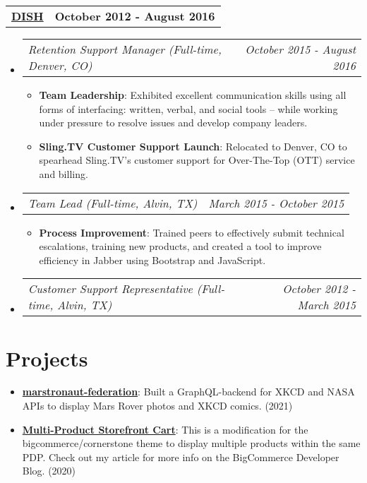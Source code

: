 \documentclass[letterpaper,10.8pt]{article}
\makeatletter
\newcommand{\resumeItem}[2]{
  \item\small{
    \textbf{#1}{: #2 \vspace{-2pt}}
  }
}
\newcommand{\jobLineItem}[2]{
  \vspace{0pt}\item[]
    \begin{tabular*}{0.98\textwidth}{l@{\extracolsep{\fill}}r}
      \textit{#1} & \textit{\small #2} \\
    \end{tabular*}\vspace{-4pt}
}
\newcommand{\employerTitle}[3]{
  \begin{tabular*}{1\textwidth}{l@{\extracolsep{\fill}}r}
    \href{#1}{\textbf{#2}} & \textbf{#3} \\
  \end{tabular*}\vspace{-4pt}
}
\newcommand{\resumeSubItem}[2]{\resumeItem{#1}{#2}\vspace{-5pt}}
\newcommand{\resumeSubHeadingListStart}{\begin{itemize}[leftmargin=*]}
\newcommand{\resumeSubHeadingListEnd}{\end{itemize}}
\newcommand{\resumeItemListStart}{\begin{itemize}}
\newcommand{\resumeItemListEnd}{\end{itemize}\vspace{-5pt}}
\makeatother
\begin{document}
  \employerTitle
    {https://dish.com}{DISH}{October 2012 - August 2016}
  \resumeSubHeadingListStart
    \jobLineItem
        {Retention Support Manager (Full-time, Denver, CO)}{October 2015 - August 2016}
    \resumeItemListStart
        \resumeItem{Team Leadership}{Exhibited excellent communication skills using all forms of interfacing: written, verbal, and social tools – while working under pressure to resolve issues and develop company leaders.} 
        \resumeItem{Sling.TV Customer Support Launch}
        {Relocated to Denver, CO to spearhead Sling.TV's customer support for Over-The-Top (OTT) service and billing.}
    \resumeItemListEnd
    \jobLineItem
        {Team Lead (Full-time, Alvin, TX)}{March 2015 - October 2015}
    \resumeItemListStart
        \resumeItem{Process Improvement}
        {Trained peers to effectively submit technical escalations, training new products, and created a tool to improve efficiency in Jabber using Bootstrap and JavaScript.}
      \resumeItemListEnd
    \jobLineItem
		    {Customer Support Representative (Full-time, Alvin, TX)}{October 2012 - March 2015}
    \resumeSubHeadingListEnd

\section{Projects}
\resumeSubHeadingListStart
\resumeSubItem{\href{https:/kosenkor.in/}{marstronaut-federation}}{Built a GraphQL-backend for XKCD and NASA APIs to display Mars Rover photos and XKCD comics. (2021)}
\resumeSubItem{\href{https://github.com/obrien-k/multi-sf-cart}{Multi-Product Storefront Cart}}{This is a modification for the bigcommerce/cornerstone theme to display multiple products within the same PDP. Check out my article for more info on the BigCommerce Developer Blog. (2020)}
\vspace{5px}
\resumeSubHeadingListEnd

\end{document}
